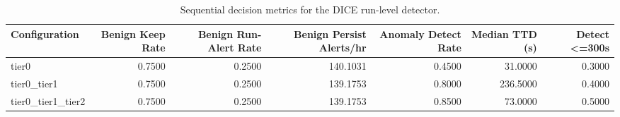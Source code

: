 \begin{table}[t]
\centering
\caption{Sequential decision metrics for the DICE run-level detector.}
\label{tab:dice_sequential_metrics}
\footnotesize
\begin{tabular}{lrrrrrr}
\toprule
Configuration & Benign Keep Rate & Benign Run-Alert Rate & Benign Persist Alerts/hr & Anomaly Detect Rate & Median TTD (s) & Detect <=300s \\
\midrule
tier0 & 0.7500 & 0.2500 & 140.1031 & 0.4500 & 31.0000 & 0.3000 \\
tier0_tier1 & 0.7500 & 0.2500 & 139.1753 & 0.8000 & 236.5000 & 0.4000 \\
tier0_tier1_tier2 & 0.7500 & 0.2500 & 139.1753 & 0.8500 & 73.0000 & 0.5000 \\
\bottomrule
\end{tabular}

\end{table}
